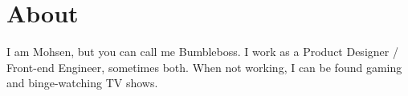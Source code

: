 \section*{About}
I am Mohsen, but you can call me \mbox{Bumbleboss}. I work as a Product Designer / Front-end Engineer, sometimes both. When not working, I can be found gaming and binge-watching TV shows.
